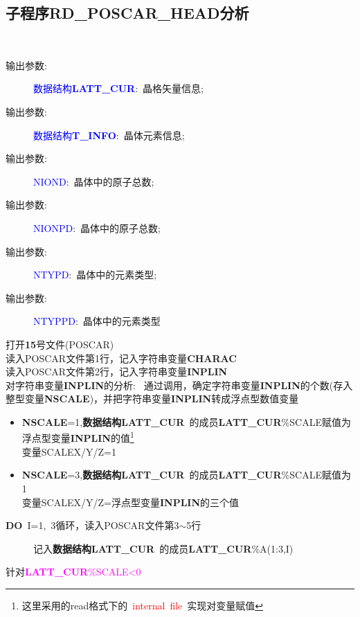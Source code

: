 \documentclass{article}      %
\begin{document}
\subsection{子程序\bf{RD\_POSCAR\_HEAD}分析}\label{tag:RD_POSCAR_HEAD}
\\
\begin{description}
	\item[输出参数:~]\textcolor{blue}{数据结构\textbf{LATT\_CUR}}:~晶格矢量信息;
	\item[输出参数:~]\textcolor{blue}{数据结构\textbf{T\_INFO}}:~晶体元素信息;
	\item[输出参数:~]\textcolor{blue}{\textrm{NIOND}}:~晶体中的原子总数;
	\item[输出参数:~]\textcolor{blue}{\textrm{NIONPD}}:~晶体中的原子总数;
	\item[输出参数:~]\textcolor{blue}{\textrm{NTYPD}}:~晶体中的元素类型;
	\item[输出参数:~]\textcolor{blue}{\textrm{NTYPPD}}:~晶体中的元素类型
\end{description}
打开\textbf{15}号文件(\textrm{POSCAR})\\
读入\textrm{POSCAR}文件第1行，记入字符串变量\textbf{CHARAC}\\
读入\textrm{POSCAR}文件第2行，记入字符串变量\textbf{INPLIN}\\
对字符串变量\textbf{INPLIN}的分析:~
通过调用，确定字符串变量\textbf{INPLIN}的个数(存入整型变量\textbf{NSCALE})，并把字符串变量\textbf{INPLIN}转成浮点型数值变量
\begin{itemize}
	\item \textbf{NSCALE}=1,\textbf{数据结构LATT\_CUR}~的成员\textbf{LATT\_CUR}\%\textrm{SCALE}赋值为浮点型变量\textbf{INPLIN}的值\footnote{这里采用的\textrm{read}格式下的~\textcolor{red}{\textrm{internal~file}}~实现对变量赋值}\\
		变量\textrm{SCALEX/Y/Z}=1
	\item \textbf{NSCALE}=3,\textbf{数据结构LATT\_CUR}~的成员\textbf{LATT\_CUR}\%\textrm{SCALE}赋值为1\\
		变量\textrm{SCALEX/Y/Z}=浮点型变量\textbf{INPLIN}的三个值
\end{itemize}
\textbf{DO}~I=1,~3循环，读入\textrm{POSCAR}文件第3$\sim$5行
\begin{description}
	\item[]记入\textbf{数据结构LATT\_CUR}~的成员\textbf{LATT\_CUR}\%\textrm{A(1:3,I)}
\end{description}
针对\textcolor{magenta}{\textbf{LATT\_CUR}\%\textrm{SCALE}<0}
\end{document}
